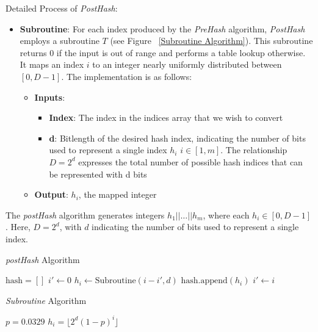 Detailed Process of \textit{PostHash}:
\begin{itemize}
    \item \textbf{Subroutine}: For each index produced by the \textit{PreHash} algorithm, \textit{PostHash} employs a subroutine \(T\) (see Figure ~\ref{Subroutine Algorithm}). This subroutine returns 0 if the input is out of range and performs a table lookup otherwise. It maps an index \(i\) to an integer nearly uniformly distributed between \([0, D-1]\). The implementation is as follows:
    \begin{itemize}
        \item \textbf{Inputs}: 
        \begin{itemize}
            \item \textbf{Index}: The index in the indices array that we wish to convert
            \item \textbf{d}: Bitlength of the desired hash index, indicating the number of bits used to represent a single index \(h_i\) \(i \in [1, m]\). The relationship \(D = 2^d\) expresses the total number of possible hash indices that can be represented with d bits
        \end{itemize}
        \item \textbf{Output}: \(h_i\), the mapped integer
    \end{itemize}
\end{itemize}

The \textit{postHash} algorithm generates integers \(h_1 || \ldots || h_m\), where each \(h_i \in [0, D-1]\). Here, \(D = 2^d\), with \(d\) indicating the number of bits used to represent a single index. 

\begin{algorithm}
    \begin{algorithmic}[1]
    \caption{\textit{postHash} Algorithm}
    \label{postHash Algorithm}
    \State $\text{hash} = []$
    \State $i' \gets 0$
        \State $h_i \gets \text{Subroutine}(i - i', d)$
        \State $\text{hash.append}(h_i)$
        \State $i' \gets i$
    \EndFor 
    \State {}
    \EndFunction
    \end{algorithmic}
    \end{algorithm}
    
    \begin{algorithm}
    \begin{algorithmic}[1]
    \caption{\textit{Subroutine} Algorithm}
    \label{Subroutine Algorithm}
    \State $p = 0.0329$
    \State $h_i = \lfloor 2^d (1-p)^{i} \rfloor$
    \State {}
    \EndFunction
    \end{algorithmic}
    \end{algorithm}

